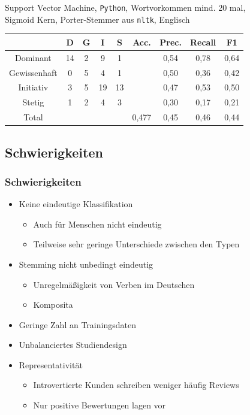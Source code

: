 \begin{frame}
\begin{center}
Support Vector Machine, \texttt{Python}, Wortvorkommen mind. 20 mal,\\
Sigmoid Kern, Porter-Stemmer aus \texttt{nltk}, Englisch

\bigskip

\begin{tabular}{|c|c|c|c|c|c|c|c|c|}
\hline
				& D 	& G	& I & S	& Acc.	& Prec. & Recall	& F1\\
\hline
Dominant 		& 14		& 2 			& 9 		& 1 		&       	& 0,54	 	& 0,78	 	& 0,64\\
Gewissenhaft 	& 0 		& 5 			& 4 		& 1 		& 			& 0,50	 	& 0,36	 	& 0,42\\
Initiativ 		& 3 		& 5				& 19		& 13		& 			& 0,47		& 0,53	 	& 0,50\\
Stetig 			& 1 		& 2 			& 4 		& 3 		& 			& 0,30	   	& 0,17	 	& 0,21\\
\hline
Total 			& 			& 				& 			& 			& 0,477		& 0,45		& 0,46  	& 0,44\\
\hline
\end{tabular}
\end{center}
\end{frame}
\subsection{Schwierigkeiten}
\begin{frame}
\frametitle{Schwierigkeiten}
\begin{itemize}
	\item Keine eindeutige Klassifikation
	\begin{itemize}
		\item Auch für Menschen nicht eindeutig
		\item Teilweise sehr geringe Unterschiede zwischen den Typen
	\end{itemize}
	\item Stemming nicht unbedingt eindeutig
	\begin{itemize}
		\item Unregelmäßigkeit von Verben im Deutschen
		\item Komposita
	\end{itemize}
	\item Geringe Zahl an Trainingsdaten
	\item Unbalanciertes Studiendesign
	\item Representativität
	\begin{itemize}
		\item Introvertierte Kunden schreiben weniger häufig Reviews
		\item Nur positive Bewertungen lagen vor
	\end{itemize}
\end{itemize}
\end{frame}